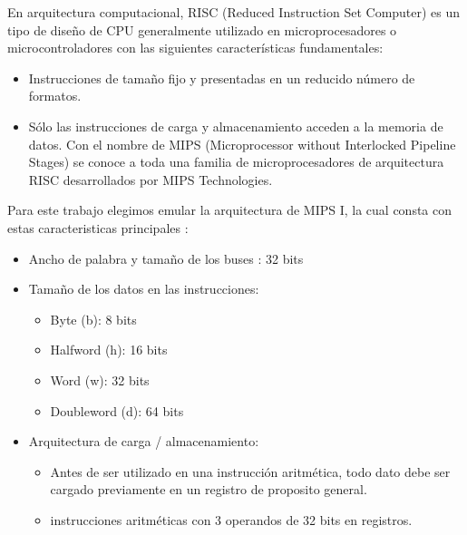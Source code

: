 \documentclass[12pt]{article}
\begin{document}
En arquitectura computacional, RISC (Reduced Instruction Set Computer) es un tipo de diseño de CPU generalmente utilizado en microprocesadores
o microcontroladores con las siguientes características fundamentales:
\begin{itemize}
\item Instrucciones de tamaño fijo y presentadas en un reducido número de formatos.
\item Sólo las instrucciones de carga y almacenamiento acceden a la memoria de datos.
Con el nombre de MIPS (Microprocessor without Interlocked Pipeline Stages) se conoce a toda una familia de microprocesadores
de arquitectura RISC desarrollados por MIPS Technologies.
\end{itemize}
Para este trabajo elegimos emular  la arquitectura de MIPS I, la cual consta con estas caracteristicas  principales :
\begin{itemize}
\item Ancho de palabra y tamaño de los buses : 32 bits
\item  Tamaño de los datos en las instrucciones:
	\begin{itemize}
	\item Byte (b): 8 bits
	\item Halfword (h): 16 bits
	\item Word (w): 32 bits
	\item Doubleword (d): 64 bits
	\end{itemize}
 \item Arquitectura de carga / almacenamiento:
 	\begin{itemize}
 	\item Antes de ser utilizado en una instrucción aritmética, todo dato debe
 	ser cargado previamente en un registro de proposito general.
 	\item instrucciones aritméticas con 3 operandos de 32 bits en registros.
 	\end{itemize}
\end{itemize}
\end{document}
